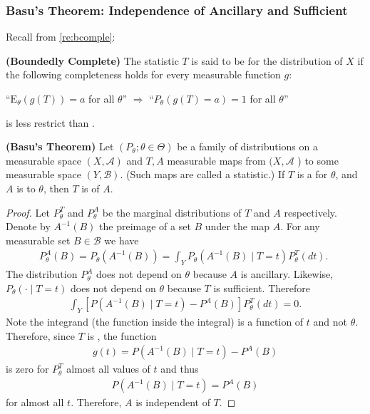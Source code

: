 \documentclass{article}
\newcommand{\bfs}[1]{\textbf{({#1}) }}
\begin{document}
\subsubsection{Basu's Theorem: Independence of Ancillary and Sufficient} \label{sec:basu}
Recall from \cref{re:bcomple}:
\begin{defa} \bfs{Boundedly Complete}
The statistic $T$ is said to be  for the distribution of $X$ if the following completeness holds for every   measurable function $g$:

\centerline{``$\mathrm{E}_{\theta}(g(T))=a$ for all $\theta$'' $\Rightarrow$ ``${P}_{\theta}(g(T)=a)=1$ for all $\theta$''}
\end{defa}
\begin{rema}
 is less restrict than .
\end{rema}
\begin{thma}\bfs{Basu's Theorem}
Let $\left(P_{\theta} ; \theta \in \Theta\right)$ be a family of distributions on a measurable space $(X, \mathcal{A})$ and $T, A$ measurable
maps from $(X, \mathcal{A}$ ) to some measurable space $(Y, \mathcal{B}) .$ (Such maps are called a statistic.) If $T$ is a
 for $\theta$, and $A$ is  to $\theta$, then $T$ is  of $A$.
\end{thma}
\begin{proof}
Let $P_{\theta}^{T}$ and $P_{\theta}^{A}$ be the marginal distributions of $T$ and $A$ respectively.
Denote by $A^{-1}(B)$ the preimage of a set $B$ under the map $A$. For any measurable set $B \in \mathcal{B}$ we have
\begin{align*}
P_{\theta}^{A}(B)=P_{\theta}\left(A^{-1}(B)\right)=\int_{Y} P_{\theta}\left(A^{-1}(B) \mid T=t\right) P_{\theta}^{T}(d t) \text {. }
\end{align*}
The distribution $P_{\theta}^{A}$ does not depend on $\theta$ because $A$ is ancillary. Likewise, $P_{\theta}(\cdot \mid T=t)$ does not
depend on $\theta$ because $T$ is sufficient. Therefore
\begin{align*}
\int_{Y}\left[P\left(A^{-1}(B) \mid T=t\right)-P^{A}(B)\right] P_{\theta}^{T}(d t)=0 .
\end{align*}
Note the integrand (the function inside the integral) is a function of $t$ and not $\theta$. Therefore, since $T$ is
, the function
\begin{align*}
g(t)=P\left(A^{-1}(B) \mid T=t\right)-P^{A}(B)
\end{align*}
is zero for $P_{\theta}^{T}$ almost all values of $t$ and thus
\begin{align*}
P\left(A^{-1}(B) \mid T=t\right)=P^{A}(B)
\end{align*}
for almost all $t .$ Therefore, $A$ is independent of $T .$
\end{proof}
\end{document}
